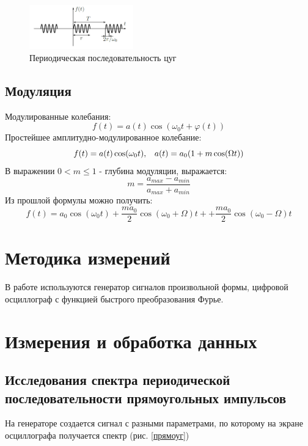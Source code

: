 \documentclass[a4paper,12pt]{article} %
\begin{document}
\begin{figure}[h!]
\begin{center}
\includegraphics[width=0.4\textwidth]{цуги}
\caption{Периодическая последовательность цуг} \label{цуги}
\end{center}
\end{figure}
\subsection*{Модуляция}
Модулированные колебания:
\begin{equation}
f(t) = a(t) \cos (\omega_0 t+\varphi(t))
\end{equation}
Простейшее амплитудно-модулированное колебание:
\begin{equation}
f(t)= a(t) \cos (\omega_0 t), \hspace{3mm} a(t) = a_0(1+m\cos(\Omega t))
\end{equation}
В выражении $0 < m \leq 1$ - глубина модуляции, выражается:
\begin{equation}
m = \dfrac{a_{max}-a_{min}}{a_{max}+a_{min}}
\end{equation}
Из прошлой формулы можно получить:
\begin{equation}
f(t) = a_0 \cos (\omega_0 t) +\dfrac{ma_0}{2}\cos (\omega_0 +\Omega)t++\dfrac{ma_0}{2}\cos (\omega_0 -\Omega)t
\end{equation}

\section{Методика измерений}
В работе используются генератор сигналов произвольной формы, цифровой осциллограф с функцией быстрого преобразования Фурье.

\section{Измерения и обработка данных}
\subsection*{Исследования спектра периодической последовательности прямоугольных импульсов}
На генераторе создается сигнал с разными параметрами, по которому на экране осциллографа получается спектр (рис. \ref{прямоуг})
\end{document}
